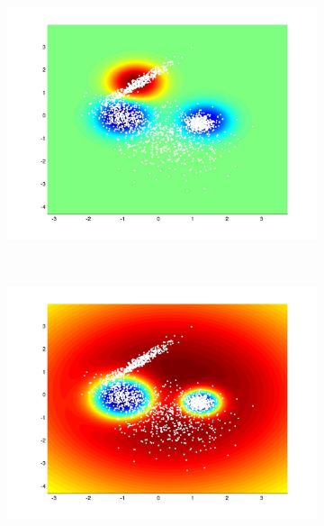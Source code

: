 \documentclass[useAMS,usenatbib,fleqn]{mn2e}
\begin{document}
\begin{figure}
         \begin{subfigure}[b]{70 px}
                \includegraphics[trim = 150px 100px 150px 70px, clip=true,width=\textwidth]{global3.jpg}
        \end{subfigure}
        ~
         \begin{subfigure}[b]{70 px}
                \includegraphics[trim = 150px 100px 150px 70px, clip=true,width=\textwidth]{VL3.jpg}
        \end{subfigure}
        ~
        \begin{subfigure}[b]{70 px}

\end{subfigure}
\end{figure}
\end{document}
